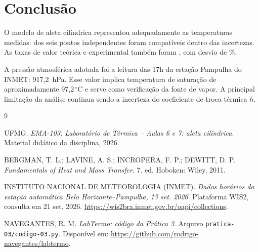 \documentclass[11pt,a4paper]{article}
\newcommand{\Patm}{917{,}2}
\newcommand{\Tsat}{97{,}2}
\begin{document}
\section{Conclusão}

O modelo de aleta cilíndrica representou adequadamente as temperaturas medidas:
\NCompativeis{} dos seis pontos independentes foram compatíveis dentro das
incertezas. As taxas de calor teórica e experimental também foram
\QualificacaoTaxa, com desvio de \DesvioQ\%.

A pressão atmosférica adotada foi a leitura das 17h da estação Pampulha do
INMET: \Patm\ hPa. Esse valor implica temperatura de saturação de aproximadamente
\Tsat\,$^{\circ}$C e serve como verificação da fonte de vapor. A principal
limitação da análise continua sendo a incerteza do coeficiente de troca térmica
$h$.

\begin{thebibliography}{9}

UFMG. \textit{EMA-103: Laboratório de Térmica -- Aulas 6 e 7: aleta
cilíndrica}. Material didático da disciplina, 2026.

BERGMAN, T. L.; LAVINE, A. S.; INCROPERA, F. P.; DEWITT, D. P.
\textit{Fundamentals of Heat and Mass Transfer}. 7. ed. Hoboken: Wiley, 2011.

INSTITUTO NACIONAL DE METEOROLOGIA (INMET). \textit{Dados horários da estação
automática Belo Horizonte--Pampulha, 13 set. 2026}. Plataforma WIS2, consulta
em 21 set. 2026. \url{https://wis2bra.inmet.gov.br/oapi/collections}.

NAVEGANTES, R. M. \textit{LabTermo: código da Prática 3}. Arquivo
\texttt{pratica-03/codigo-03.py}. Disponível em:
\url{https://github.com/rodrigo-navegantes/labtermo}.

\end{thebibliography}
\end{document}
